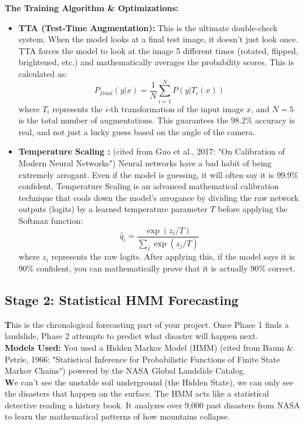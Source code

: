 \documentclass[11pt,a4paper]{article}
\begin{document}
\textbf{The Training Algorithm \& Optimizations:} 
\begin{itemize}
    \item \textbf{TTA (Test-Time Augmentation):} This is the ultimate double-check system. When the model looks at a final test image, it doesn't just look once. TTA forces the model to look at the image 5 different times (rotated, flipped, brightened, etc.) and mathematically averages the probability scores. This is calculated as:
    \begin{equation}
        P_{final}(y|x) = \frac{1}{N} \sum_{i=1}^{N} P(y | T_i(x))
    \end{equation}
    where $T_i$ represents the $i$-th transformation of the input image $x$, and $N=5$ is the total number of augmentations. This guarantees the 98.2\% accuracy is real, and not just a lucky guess based on the angle of the camera.
    
    \item \textbf{Temperature Scaling :} (cited from Guo et al., 2017: "On Calibration of Modern Neural Networks") Neural networks have a bad habit of being extremely arrogant. Even if the model is guessing, it will often say it is 99.9\% confident. Temperature Scaling is an advanced mathematical calibration technique that cools down the model's arrogance by dividing the raw network outputs (logits) by a learned temperature parameter $T$ before applying the Softmax function:
    \begin{equation}
        \hat{q}_i = \frac{\exp(z_i / T)}{\sum_j \exp(z_j / T)}
    \end{equation}
    where $z_i$ represents the raw logits. After applying this, if the model says it is 90\% confident, you can mathematically prove that it is actually 90\% correct.
\end{itemize}



\subsection{ Stage 2: Statistical HMM Forecasting}
\textbf This is the chronological forecasting part of your project. Once Phase 1 finds a landslide, Phase 2 attempts to predict what disaster will happen next. \\
\textbf{Models Used:} You used a Hidden Markov Model (HMM) (cited from Baum \& Petrie, 1966: "Statistical Inference for Probabilistic Functions of Finite State Markov Chains") powered by the NASA Global Landslide Catalog. \\
\textbf We can't see the unstable soil underground (the Hidden State), we can only see the disasters that happen on the surface. The HMM acts like a statistical detective reading a history book. It analyzes over 9,000 past disasters from NASA to learn the mathematical patterns of how mountains collapse. \\
\end{document}
